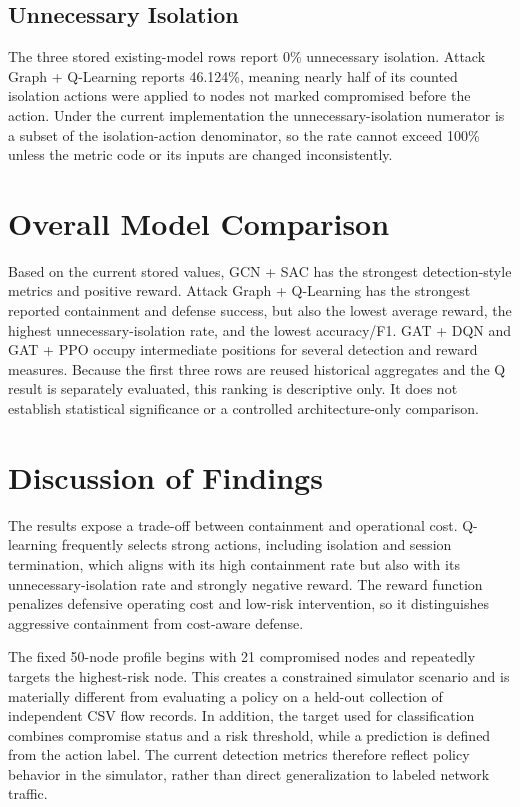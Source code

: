 \documentclass[12pt,a4paper]{report}
\begin{document}
\subsection{Unnecessary Isolation}

The three stored existing-model rows report 0\% unnecessary isolation. Attack Graph + Q-Learning reports 46.124\%, meaning nearly half of its counted isolation actions were applied to nodes not marked compromised before the action. Under the current implementation the unnecessary-isolation numerator is a subset of the isolation-action denominator, so the rate cannot exceed 100\% unless the metric code or its inputs are changed inconsistently.

\section{Overall Model Comparison}

Based on the current stored values, GCN + SAC has the strongest detection-style metrics and positive reward. Attack Graph + Q-Learning has the strongest reported containment and defense success, but also the lowest average reward, the highest unnecessary-isolation rate, and the lowest accuracy/F1. GAT + DQN and GAT + PPO occupy intermediate positions for several detection and reward measures. Because the first three rows are reused historical aggregates and the Q result is separately evaluated, this ranking is descriptive only. It does not establish statistical significance or a controlled architecture-only comparison.

\section{Discussion of Findings}

The results expose a trade-off between containment and operational cost. Q-learning frequently selects strong actions, including isolation and session termination, which aligns with its high containment rate but also with its unnecessary-isolation rate and strongly negative reward. The reward function penalizes defensive operating cost and low-risk intervention, so it distinguishes aggressive containment from cost-aware defense.

The fixed 50-node profile begins with 21 compromised nodes and repeatedly targets the highest-risk node. This creates a constrained simulator scenario and is materially different from evaluating a policy on a held-out collection of independent CSV flow records. In addition, the target used for classification combines compromise status and a risk threshold, while a prediction is defined from the action label. The current detection metrics therefore reflect policy behavior in the simulator, rather than direct generalization to labeled network traffic.
\end{document}

